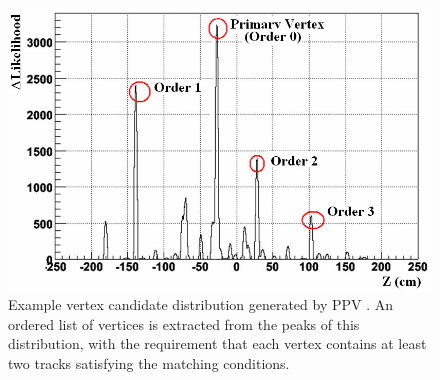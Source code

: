 \begin{figure}
  \includegraphics[width=1.0\textwidth]{figures/ppv-candidate-distribution}
  \caption{Example vertex candidate distribution generated by PPV \cite{vertex-finder-starnote}. An ordered list of vertices is extracted from the peaks of this distribution, with the requirement that each vertex contains at least two tracks satisfying the matching conditions.}
  \label{fig:ppv-candidate-distribution}
\end{figure}
